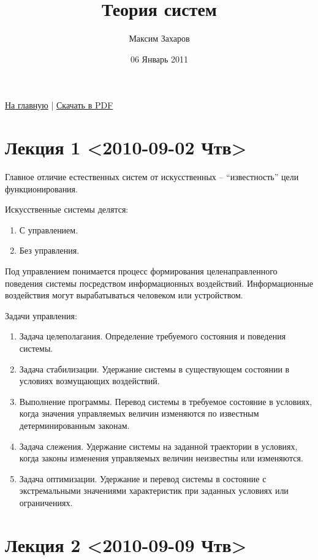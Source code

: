 \documentclass[12pt, russian, oneside, article]{ncc}
\begin{document}
\title{Теория систем}
\author{Максим Захаров}
\date{06 Январь 2011}
\maketitle

\setcounter{tocdepth}{3}
\tableofcontents
\vspace*{1cm}


\href{file:///home/maxim/Documents/Git/lectures/index.org}{На главную} | \href{file:///home/maxim/Documents/Git/lectures/other/TS_Lectures.pdf}{Скачать в PDF}

\section{Лекция 1 <2010-09-02 Чтв>}
\label{sec-1}


Главное отличие естественных систем от искусственных -- ``известность'' цели функционирования.

Искусственные системы делятся:
\begin{enumerate}
\item С управлением.
\item Без управления.
\end{enumerate}

Под управлением понимается процесс формирования целенаправленного поведения системы посредством информационных воздействий. Информационные воздействия могут вырабатываться человеком или устройством.   
  
Задачи управления:
\begin{enumerate}
\item Задача целеполагания. Определение требуемого состояния и поведения системы.
\item Задача стабилизации. Удержание системы в существующем состоянии в условиях возмущающих воздействий.
\item Выполнение программы. Перевод системы в требуемое состояние в условиях, когда значения управляемых величин изменяются по известным детерминированным законам.
\item Задача слежения. Удержание системы на заданной траектории в условиях, когда законы изменения управляемых величин неизвестны или изменяются.
\item Задача оптимизации. Удержание и перевод системы в состояние с экстремальными значениями характеристик при заданных условиях или ограничениях.
\end{enumerate}
\section{Лекция 2 <2010-09-09 Чтв>}
\label{sec-2}
\end{document}
